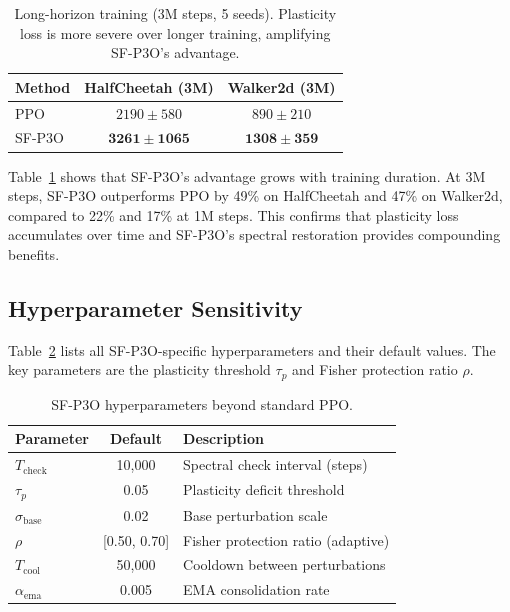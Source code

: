 \documentclass{article}
\begin{document}
\begin{table}[t]
\centering
\caption{Long-horizon training (3M steps, 5 seeds). Plasticity loss is more severe over longer training, amplifying SF-P3O's advantage.}
\label{tab:longrun}
\begin{tabular}{lcc}
\toprule
\textbf{Method} & \textbf{HalfCheetah (3M)} & \textbf{Walker2d (3M)} \\
\midrule
PPO              & $2190 \pm 580$  & $890 \pm 210$  \\
SF-P3O           & $\mathbf{3261 \pm 1065}$ & $\mathbf{1308 \pm 359}$ \\
\bottomrule
\end{tabular}
\end{table}

Table~\ref{tab:longrun} shows that SF-P3O's advantage grows with training duration. At 3M steps, SF-P3O outperforms PPO by 49\% on HalfCheetah and 47\% on Walker2d, compared to 22\% and 17\% at 1M steps. This confirms that plasticity loss accumulates over time and SF-P3O's spectral restoration provides compounding benefits.


\subsection{Hyperparameter Sensitivity}
\label{sec:sensitivity}

Table~\ref{tab:hyperparams} lists all SF-P3O-specific hyperparameters and their default values. The key parameters are the plasticity threshold $\tau_p$ and Fisher protection ratio $\rho$.

\begin{table}[t]
\centering
\caption{SF-P3O hyperparameters beyond standard PPO.}
\label{tab:hyperparams}
\begin{tabular}{lcp{6cm}}
\toprule
\textbf{Parameter} & \textbf{Default} & \textbf{Description} \\
\midrule
$T_{\text{check}}$ & 10{,}000 & Spectral check interval (steps) \\
$\tau_p$ & 0.05 & Plasticity deficit threshold \\
$\sigma_{\text{base}}$ & 0.02 & Base perturbation scale \\
$\rho$ & [0.50, 0.70] & Fisher protection ratio (adaptive) \\
$T_{\text{cool}}$ & 50{,}000 & Cooldown between perturbations \\
$\alpha_{\text{ema}}$ & 0.005 & EMA consolidation rate \\
\bottomrule
\end{tabular}
\end{table}
\end{document}
